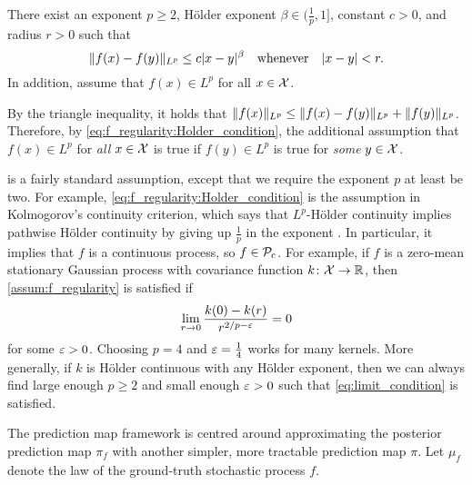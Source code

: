 \documentclass[12pt, twoside]{report}
\begin{document}
\begin{assumption} \label{assum:f_regularity}
    There exist an exponent $p\ge 2$, H\"older exponent $\beta \in (\tfrac1p, 1]$, constant $c > 0$, and radius $r > 0$ such that
    \begin{equation} \label{eq:f_regularity:Holder_condition}
        \norm{f(x) - f(y)}_{L^p} \le c \abs{x - y}^\beta
        \quad\text{whenever}\quad
        \abs{x - y} < r.
    \end{equation}
    In addition, assume that $f(x) \in L^p$ for all $x \in \X$.
\end{assumption}

By the triangle inequality, it holds that $\norm{f(x)}_{L^p} \le \norm{f(x) - f(y)}_{L^p} + \norm{f(y)}_{L^p}$.
Therefore, by \eqref{eq:f_regularity:Holder_condition}, the additional assumption that $f(x) \in L^p$ for \emph{all} $x \in \X$ is true if $f(y) \in L^p$ is true for \emph{some} $y \in \X$.

 is a fairly standard assumption, except that we require the exponent $p$ at least be two.
For example, \eqref{eq:f_regularity:Holder_condition} is the assumption in Kolmogorov's continuity criterion, which says that $L^p$-H\"older continuity 
implies pathwise H\"older continuity by giving up $\frac1p$ in the exponent \parencite[Section 4.2, Theorem 1.4.2;][]{Norris:2018:Advanced_Probability}.
In particular, it implies that $f$ is a continuous process, so $f \in \Pc\ss{c}$.
For example, if $f$ is a zero-mean stationary Gaussian process with covariance function $k\colon \X \to \R$, then
\cref{assum:f_regularity} is satisfied if
\begin{equation} \label{eq:limit_condition}
    \lim_{r \to 0} \frac{k(0) - k(r)}{r^{2/p - \e}} = 0
\end{equation}
for some $\e > 0$.
Choosing $p = 4$ and $\e = \tfrac14$ works for many kernels.
More generally, if $k$ is H\"older continuous with any H\"older exponent, then we can always find large enough $p \ge 2$ and small enough $\e > 0$ such that \eqref{eq:limit_condition} is satisfied.

The prediction map framework is centred around approximating the posterior prediction map $\pi_f$ with another simpler, more tractable prediction map $\pi$.
Let $\mu_f$ denote the law of the ground-truth stochastic process $f$.
\end{document}
